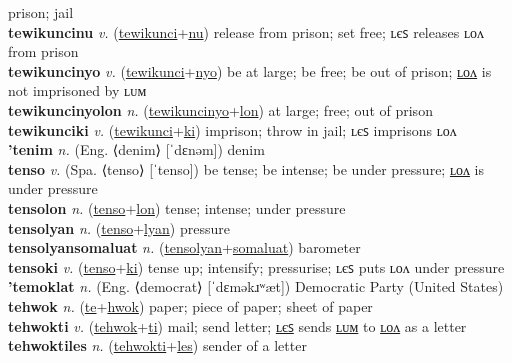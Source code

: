 prison; jail \label{tewikuncilyot} \\
\textbf{tewikuncinu} \textit{v.} (\hyperref[tewikunci]{tewikunci}+\hyperref[nu]{nu})
release from prison; set free; ʟєꜱ releases ʟᴏᴧ from prison \label{tewikuncinu} \\
\textbf{tewikuncinyo} \textit{v.} (\hyperref[tewikunci]{tewikunci}+\hyperref[nyo]{nyo})
be at large; be free; be out of prison; \hyperref[tewikuncinyolon]{ʟᴏᴧ} is not imprisoned by ʟᴜᴍ \label{tewikuncinyo} \\
\textbf{tewikuncinyolon} \textit{n.} (\hyperref[tewikuncinyo]{tewikuncinyo}+\hyperref[lon]{lon})
at large; free; out of prison \label{tewikuncinyolon} \\
\textbf{tewikunciki} \textit{v.} (\hyperref[tewikunci]{tewikunci}+\hyperref[ki]{ki})
imprison; throw in jail; ʟєꜱ imprisons ʟᴏᴧ \label{tewikunciki} \\
\textbf{'tenim} \textit{n.} (Eng. ⟨denim⟩ [ˈdɛnəm])
denim \label{'tenim} \\
\textbf{tenso} \textit{v.} (Spa. ⟨tenso⟩ [ˈtenso])
be tense; be intense; be under pressure; \hyperref[tensolon]{ʟᴏᴧ} is under pressure \label{tenso} \\
\textbf{tensolon} \textit{n.} (\hyperref[tenso]{tenso}+\hyperref[lon]{lon})
tense; intense; under pressure \label{tensolon} \\
\textbf{tensolyan} \textit{n.} (\hyperref[tenso]{tenso}+\hyperref[lyan]{lyan})
pressure \label{tensolyan} \\
\textbf{tensolyansomaluat} \textit{n.} (\hyperref[tensolyan]{tensolyan}+\hyperref[somaluat]{somaluat})
barometer \label{tensolyansomaluat} \\
\textbf{tensoki} \textit{v.} (\hyperref[tenso]{tenso}+\hyperref[ki]{ki})
tense up; intensify; pressurise; ʟєꜱ puts ʟᴏᴧ under pressure \label{tensoki} \\
\textbf{'temoklat} \textit{n.} (Eng. ⟨democrat⟩ [ˈdɛməkɹʷæt])
Democratic Party (United States) \label{'temoklat} \\
\textbf{tehwok} \textit{n.} (\hyperref[te]{te}+\hyperref[hwok]{hwok})
paper; piece of paper; sheet of paper \label{tehwok} \\
\textbf{tehwokti} \textit{v.} (\hyperref[tehwok]{tehwok}+\hyperref[ti]{ti})
mail; send letter; \hyperref[tehwoktiles]{ʟєꜱ} sends \hyperref[tehwoktilum]{ʟᴜᴍ} to \hyperref[tehwoktilon]{ʟᴏᴧ} as a letter \label{tehwokti} \\
\textbf{tehwoktiles} \textit{n.} (\hyperref[tehwokti]{tehwokti}+\hyperref[les]{les})
sender of a letter \label{tehwoktiles} \\
